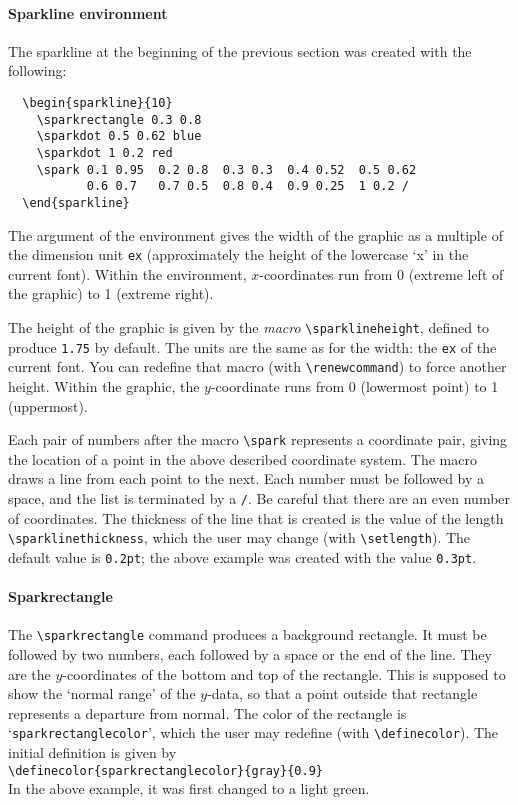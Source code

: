 \documentclass{article}
\begin{document}
\paragraph{Sparkline environment}
The sparkline at the beginning of the previous section was created with the
following:
\begin{verbatim}
  \begin{sparkline}{10}
    \sparkrectangle 0.3 0.8
    \sparkdot 0.5 0.62 blue
    \sparkdot 1 0.2 red
    \spark 0.1 0.95  0.2 0.8  0.3 0.3  0.4 0.52  0.5 0.62
           0.6 0.7   0.7 0.5  0.8 0.4  0.9 0.25  1 0.2 /
  \end{sparkline}
\end{verbatim}

The argument of the environment gives the width of the graphic as a
multiple of the dimension unit \texttt{ex} (approximately the height of
the lowercase `x' in the current font). Within the environment,
$x$-coordinates run from 0 (extreme left of the graphic) to 1 (extreme
right).

The height of the graphic is given by the \emph{macro}
\verb$\sparklineheight$, defined to produce \texttt{1.75} by default.
The units are the same as for the width: the \texttt{ex} of the current
font. You can redefine that macro (with \verb$\renewcommand$) to force
another height. Within the graphic, the $y$-coordinate runs from 0
(lowermost point) to 1 (uppermost).

Each pair of numbers after the macro \verb$\spark$ represents a
coordinate pair, giving the location of a point in the above described
coordinate system. The macro draws a line from each point to the next.
Each number must be followed by a space, and the list is terminated by a
\texttt{/}. Be careful that there are an even number of coordinates. The
thickness of the line that is created is the value of the length
\verb$\sparklinethickness$, which the user may change (with
\verb$\setlength$). The default value is \texttt{0.2pt}; the above
example was created with the value \texttt{0.3pt}.

\paragraph{Sparkrectangle}
The \verb$\sparkrectangle$ command produces a background rectangle. It
must be followed by two numbers, each followed by a space or the end of
the line. They are the $y$-coordinates of the bottom and top of the
rectangle. This is supposed to show the `normal range' of the $y$-data,
so that a point outside that rectangle represents a departure from
normal. The color of the rectangle is `\texttt{sparkrectanglecolor}',
which the user may redefine (with
\verb$\definecolor$). The initial definition is given by \\
\indent\verb$\definecolor{sparkrectanglecolor}{gray}{0.9}$\\
In the above example, it was first changed to a light green.
\end{document}
